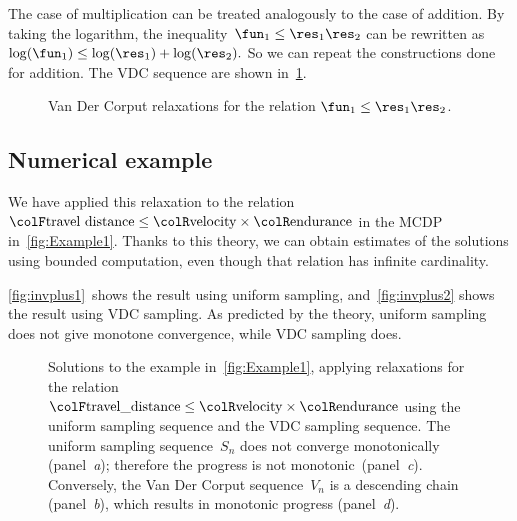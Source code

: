 The case of multiplication can be treated analogously to the case
of addition. By taking the logarithm, the inequality~$\fun_{1}\leq\res_{1}\res_{2}$
can be rewritten as~$\log(\fun_{1})\leq\log(\res_{1})+\log(\res_{2}).$
So we can repeat the constructions done for addition. The VDC sequence
are shown in~\cref{fig:approx_invmult}.

\begin{figure}[h]
  \begin{centering}
    \par
  \end{centering}
  \caption{\label{fig:approx_invmult}Van Der Corput relaxations for the relation
    $\fun_{1}\leq\res_{1}\res_{2}$.}
\end{figure}

\subsection{Numerical example}

We have applied this relaxation to the relation ${\colF\text{travel distance}}\leq{\colR\text{velocity}}\times{\colR\text{endurance}}$ in the MCDP in~\cref{fig:Example1}. Thanks to this theory, we can obtain estimates of the solutions using bounded computation, even though that relation has infinite cardinality.

\cref{fig:invplus1}~shows the result using uniform sampling,
and~\cref{fig:invplus2} shows the result using VDC sampling.
As predicted by the theory, uniform sampling does not give monotone
convergence, while VDC sampling does.
\begin{figure}[t]
  \centering
  \centering

  \caption{Solutions to the example in~\cref{fig:Example1}, applying relaxations
  for the relation ${\colF\text{travel\_distance}}\leq{\colR\text{velocity}}\times{\colR\text{endurance}}$
    using the uniform sampling sequence and the VDC sampling sequence.
    The uniform sampling sequence~$S_{n}$ does not converge monotonically
    (panel~\emph{a}); therefore the progress is not monotonic~(panel\emph{~c}).
    Conversely, the Van Der Corput sequence~$V_{n}$ is a descending
    chain (panel~\emph{b}), which results in monotonic progress (panel~\emph{d}).}
\end{figure}


